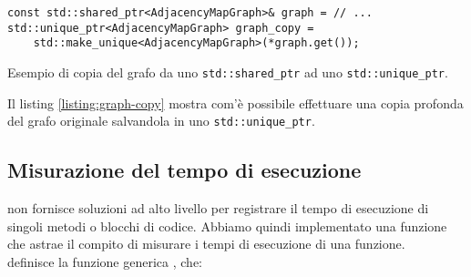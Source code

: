 \begin{listing}[!ht]
\begin{verbatim}
const std::shared_ptr<AdjacencyMapGraph>& graph = // ...
std::unique_ptr<AdjacencyMapGraph> graph_copy =
    std::make_unique<AdjacencyMapGraph>(*graph.get());
\end{verbatim}
\caption{Esempio di copia del grafo da uno \texttt{std::shared_ptr} ad uno \texttt{std::unique_ptr}.}
\label{listing:graph-copy}
\end{listing}

 \noindent Il listing \ref{listing:graph-copy} mostra com'è possibile effettuare una copia profonda del grafo originale salvandola in uno \texttt{std::unique_ptr}.

\subsection{Misurazione del tempo di esecuzione}
\label{sub:stopwatch}

\noindent {} non fornisce soluzioni ad alto livello per registrare il tempo di esecuzione di singoli metodi o blocchi di codice. Abbiamo quindi implementato una funzione  che astrae il compito di misurare i tempi di esecuzione di una funzione. \\

\noindent {} definisce la
funzione generica , che:


